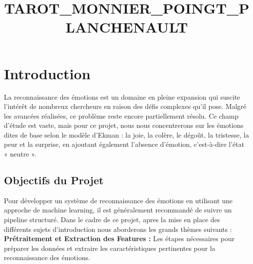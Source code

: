 \documentclass{rapport}
\title{TAROT_MONNIER_POINGT_PLANCHENAULT} %
\begin{document}





\fairemarges %
\fairepagedegarde %
\tabledematieres %


\section{Introduction}

La reconnaissance des émotions est un domaine en pleine expansion qui suscite l'intérêt de
nombreux chercheurs en raison des défis complexes qu'il pose.
Malgré les avancées réalisées, ce problème reste encore partiellement résolu.
Ce champ d'étude est vaste, mais pour ce projet, nous nous concentrerons sur les émotions dites de base selon le modèle d'Ekman :
la joie, la colère, le dégoût, la tristesse, la peur et la surprise, en ajoutant également l'absence d'émotion,
c'est-à-dire l'état « neutre ».

\subsection{Objectifs du Projet}
Pour développer un système de reconnaissance des émotions en utilisant une approche de machine learning,
il est généralement recommandé de suivre un pipeline structuré. Dans le cadre de ce projet, apres la mise en place
des différents sujets d'introduction nous aborderons les grands thèmes suivants :\\

\textbf{Prétraitement et Extraction des Features :}
Les étapes nécessaires pour préparer les données et extraire les caractéristiques pertinentes pour la reconnaissance des émotions.\\
\end{document}
